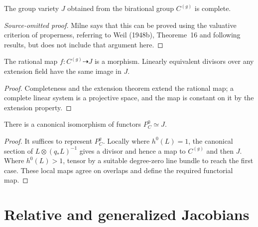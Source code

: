 \begin{proposition}\label{prop:milne-weil-jacobian-complete}
The group variety $J$ obtained from the birational group $C^{(g)}$ is complete.
\end{proposition}
\begin{proof}[Source-omitted proof]
Milne says that this can be proved using the valuative criterion of
properness, referring to Weil (1948b), Theoreme~16 and following results, but
does not include that argument here.
\end{proof}
\begin{corollary}\label{cor:milne-weil-map-morphism}
The rational map $f:C^{(g)}\dashrightarrow J$ is a morphism. Linearly equivalent divisors over any extension field have the same image in $J$.
\end{corollary}

\begin{proof}
Completeness and the extension theorem extend the rational map; a complete linear system is a projective space, and the map is constant on it by the extension property.
\end{proof}

\begin{theorem}\label{thm:milne-weil-jacobian-representability}
There is a canonical isomorphism of functors $P_C^0\simeq J$.
\end{theorem}

\begin{proof}
It suffices to represent $P_C^g$. Locally where $h^0(L)=1$, the canonical section of $L\otimes(q_*L)^{-1}$ gives a divisor and hence a map to $C^{(g)}$ and then $J$. Where $h^0(L)>1$, tensor by a suitable degree-zero line bundle to reach the first case. These local maps agree on overlaps and define the required functorial map.

\end{proof}

\section{Relative and generalized Jacobians}

